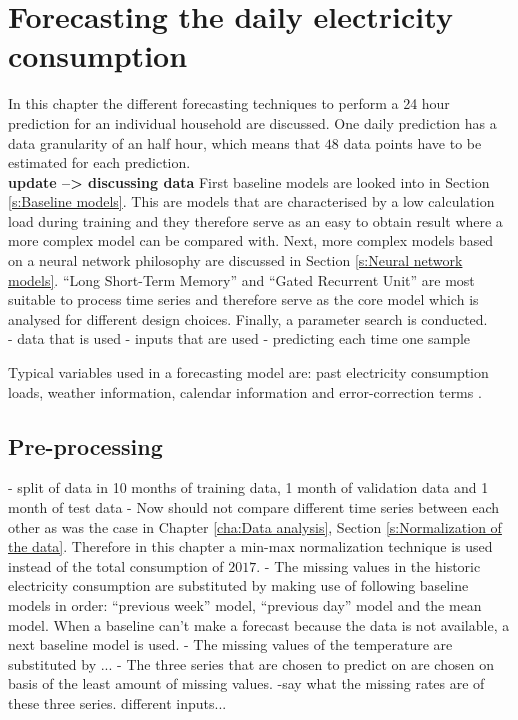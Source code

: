 \chapter{Forecasting the daily electricity consumption}
\label{cha:Forecasting the daily electricity consumption}
In this chapter the different forecasting techniques to perform a 24 hour prediction for an individual household are discussed. One daily prediction has a data granularity of an half hour, which means that $ 48 $ data points have to be estimated for each prediction. \\\textbf{update --> discussing data}
First baseline models are looked into in Section \ref{s:Baseline models}. This are models that are characterised by a low calculation load during training and they therefore serve as an easy to obtain result where a more complex model can be compared with. Next, more complex models based on a neural network philosophy are discussed in Section \ref{s:Neural network models}. ``Long Short-Term Memory'' and ``Gated Recurrent Unit'' are most suitable to process time series and therefore serve as the core model which is analysed for different design choices. Finally, a parameter search is conducted.\\
 


- data that is used 
- inputs that are used
- predicting each time one sample


 Typical variables used in a forecasting model are: past electricity consumption loads, weather information, calendar information and error-correction terms \cite{loadforecastingmoor}.
\section{Pre-processing}
- split of data in 10 months of training data, 1 month of validation data and 1 month of test data
- Now should not compare different time series between each other as was the case in Chapter \ref{cha:Data analysis}, Section \ref{s:Normalization of the data}. Therefore in this chapter a min-max normalization technique is used instead of the total consumption of $ 2017 $.
- The missing values in the historic electricity consumption are substituted by making use of following baseline models in order: ``previous week'' model, ``previous day'' model and the mean model. When a baseline can't make a forecast because the data is not available, a next baseline model is used. 
- The missing values of the temperature are substituted by ...
- The three series that are chosen to predict on are chosen on basis of the least amount of missing values. 
-say what the missing rates are of these three series.
different inputs... 


